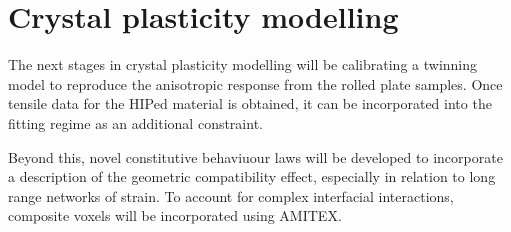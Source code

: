 \section{Crystal plasticity modelling}
The next stages in crystal plasticity modelling will be calibrating a twinning model to reproduce the anisotropic response from the rolled plate samples.
Once tensile data for the HIPed material is obtained, it can be incorporated into the fitting regime as an additional constraint.

Beyond this, novel constitutive behaviuour laws will be developed to incorporate a description of the geometric compatibility effect, especially in relation to long range networks of strain.
To account for complex interfacial interactions, composite voxels will be incorporated using AMITEX.